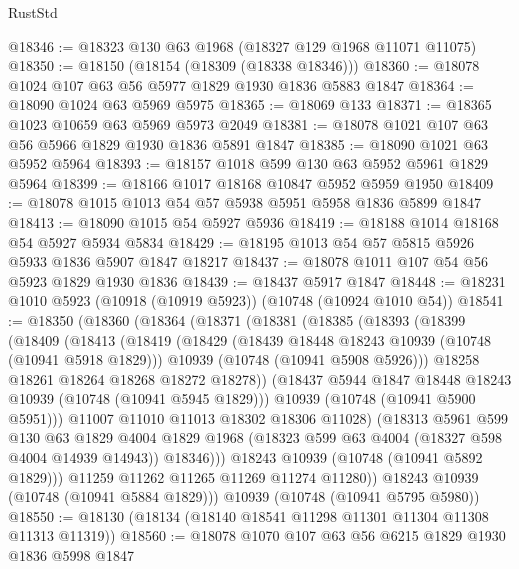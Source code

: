\begin{lexlean}{RustStd}
\begin{coremodule}
@18346 := @18323 @130 @63 @1968 (@18327 @129 @1968 @11071 @11075)
@18350 := @18150 (@18154 (@18309 (@18338 @18346)))
@18360 := @18078 @1024 @107 @63 @56 @5977 @1829 @1930 @1836 @5883 @1847
@18364 := @18090 @1024 @63 @5969 @5975
@18365 := @18069 @133
@18371 := @18365 @1023 @10659 @63 @5969 @5973 @2049
@18381 := @18078 @1021 @107 @63 @56 @5966 @1829 @1930 @1836 @5891 @1847
@18385 := @18090 @1021 @63 @5952 @5964
@18393 := @18157 @1018 @599 @130 @63 @5952 @5961 @1829 @5964
@18399 := @18166 @1017 @18168 @10847 @5952 @5959 @1950
@18409 := @18078 @1015 @1013 @54 @57 @5938 @5951 @5958 @1836 @5899 @1847
@18413 := @18090 @1015 @54 @5927 @5936
@18419 := @18188 @1014 @18168 @54 @5927 @5934 @5834
@18429 := @18195 @1013 @54 @57 @5815 @5926 @5933 @1836 @5907 @1847 @18217
@18437 := @18078 @1011 @107 @54 @56 @5923 @1829 @1930 @1836
@18439 := @18437 @5917 @1847
@18448 := @18231 @1010 @5923 (@10918 (@10919 @5923)) (@10748 (@10924 @1010 @54))
@18541 := @18350
    (@18360
      (@18364
        (@18371
          (@18381
            (@18385
              (@18393
                (@18399
                  (@18409
                    (@18413
                      (@18419
                        (@18429
                          (@18439 @18448 @18243 @10939 (@10748 (@10941 @5918 @1829)))
                          @10939
                          (@10748 (@10941 @5908 @5926)))
                        @18258
                        @18261
                        @18264
                        @18268
                        @18272
                        @18278))
                    (@18437 @5944 @1847 @18448 @18243 @10939 (@10748 (@10941 @5945 @1829)))
                    @10939
                    (@10748 (@10941 @5900 @5951)))
                  @11007
                  @11010
                  @11013
                  @18302
                  @18306
                  @11028)
                (@18313
                  @5961
                  @599
                  @130
                  @63
                  @1829
                  @4004
                  @1829
                  @1968
                  (@18323 @599 @63 @4004 (@18327 @598 @4004 @14939 @14943))
                  @18346)))
            @18243
            @10939
            (@10748 (@10941 @5892 @1829)))
          @11259
          @11262
          @11265
          @11269
          @11274
          @11280))
      @18243
      @10939
      (@10748 (@10941 @5884 @1829)))
    @10939
    (@10748 (@10941 @5795 @5980))
@18550 := @18130 (@18134 (@18140 @18541 @11298 @11301 @11304 @11308 @11313 @11319))
@18560 := @18078 @1070 @107 @63 @56 @6215 @1829 @1930 @1836 @5998 @1847

\end{coremodule}
\end{lexlean}
